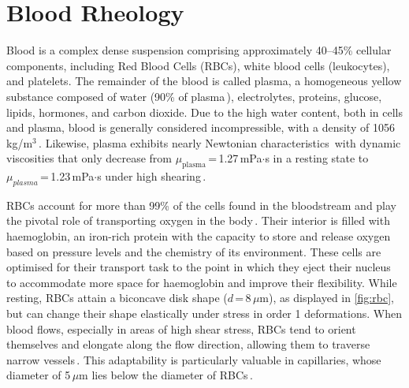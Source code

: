 \section{Blood Rheology}
Blood is a complex dense suspension comprising approximately 40--45\% cellular components, including Red Blood Cells (RBCs), white blood cells (leukocytes), and platelets. The remainder of the blood is called plasma, a homogeneous yellow substance composed of water (90\% of plasma\,\cite{Fung1993}), electrolytes, proteins, glucose, lipids, hormones, and carbon dioxide. Due to the high water content, both in cells and plasma, blood is generally considered incompressible, with a density of 1056\,kg/m$^3$\,\cite{Suzuki2021}. Likewise, plasma exhibits nearly Newtonian characteristics\,\cite{Nader2019} with dynamic viscosities that only decrease from $\mu_\text{plasma}$\,=\,1.27\,mPa$\cdot$s in a resting state to $\mu_{plasma}$\,=\,1.23\,mPa$\cdot$s under high shearing\,\cite{Rodrigues2022}.

RBCs account for more than 99\% of the cells found in the bloodstream and play the pivotal role of transporting oxygen in the body\,\cite{Fung1993}. Their interior is filled with haemoglobin, an iron-rich protein with the capacity to store and release oxygen based on pressure levels and the chemistry of its environment. These cells are optimised for their transport task to the point in which they eject their nucleus to accommodate more space for haemoglobin and improve their flexibility. While resting, RBCs attain a biconcave disk shape ($d$\,=\,8\,$\mu$m), as displayed in \autoref{fig:rbc}, but can change their shape elastically under stress in order 1 deformations. When blood flows, especially in areas of high shear stress, RBCs tend to orient themselves and elongate along the flow direction, allowing them to traverse narrow vessels\,\cite{Dirkes2024}. This adaptability is particularly valuable in capillaries, whose diameter of 5\,$\mu$m lies below the diameter of RBCs\,\cite{Nader2019}.

